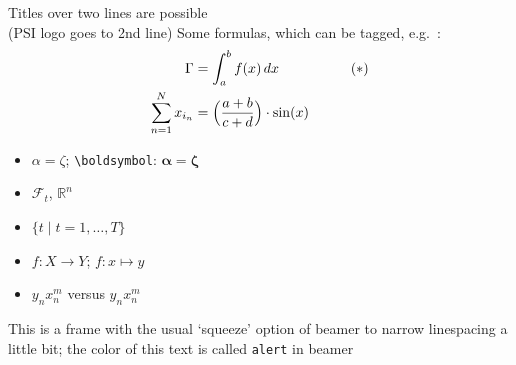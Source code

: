 \documentclass[aspectratio=169]{beamer}
\begin{document}
\begin{frame}[squeeze]{Titles over two lines are possible\\
    (PSI logo goes to 2nd line)}
  Some formulas, which can be tagged, e.g.\ \thetag{$\ast$}:
  \begin{align*}
    \Gamma  & = \int_a^b f(x)\,dx             && \tag{$\ast$}\\
    \sum_{n=1}^N x_{i_n} &= \Bigl(\frac{a+b}{c+d}\Bigr)\cdot \sin(x)  &&
  \end{align*}
  \begin{itemize}
  \item  $\alpha = \zeta$; \texttt{\textbackslash boldsymbol}: $\boldsymbol{\alpha} = \boldsymbol{\zeta}$ 
  \item $\mathcal{F}_t$, $\mathbb{R}^n$
  \item $\{t \mid t=1,\dots,T\}$
  \item $f\colon X\to Y$; $f\colon x\mapsto y$
  \item $y_nx_n^m$ versus $y_n^{}x_n^m$
  \end{itemize}
   \alert{This is a frame with the usual `squeeze' option of beamer to narrow linespacing a little bit; the color of this text is called \texttt{alert} in beamer}
  
\end{frame}
\end{document}
